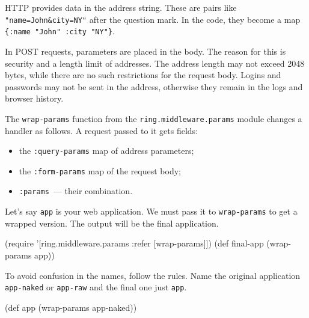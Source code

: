 \label{ring-params}


HTTP provides data in the address string. These are pairs like \verb|"name=John&city=NY"| after the question mark. In the code, they become a map \verb|{:name "John" :city "NY"}|.

In POST requests, parameters are placed in the body. The reason for this is security and a length limit of addresses. The address length may not exceed 2048 bytes, while there are no such restrictions for the request body. Logins and passwords may not be sent in the address, otherwise they remain in the logs and browser history.


The \verb|wrap-params| function from the \verb|ring.middleware.params| module changes a handler as follows. A request passed to it gets fields:

\begin{itemize}

\item
the \verb|:query-params| map of address parameters;

\item
the \verb|:form-params| map of the request body;

\item
\verb|:params|~--- their combination.

\end{itemize}

Let's say \verb|app| is your web application. We must pass it to \verb|wrap-params| to get a wrapped version. The output will be the final application.


\begin{english}
\begin{clojure}
(require '[ring.middleware.params :refer [wrap-params]])
(def final-app (wrap-params app))
\end{clojure}
\end{english}

To avoid confusion in the names, follow the rules. Name the original application \verb|app-naked| or \verb|app-raw| and the final one just \verb|app|.

\begin{english}
\begin{clojure}
(def app (wrap-params app-naked))
\end{clojure}
\end{english}


